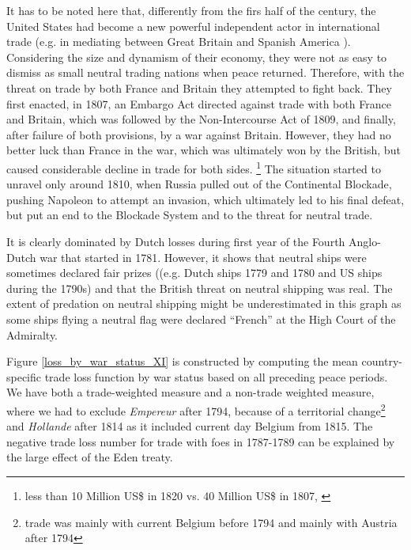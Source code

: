 \documentclass[12pt,a4paper,notitlepage,english]{article}
\begin{document}
It has to be noted here that, differently from the firs half of the century, the United States had become a new powerful independent actor in international trade (e.g. in mediating between Great Britain and Spanish America \citep{Cuenca-Esteban2014}). Considering the size and dynamism of their economy, they were not as easy to dismiss as small neutral trading nations when peace returned. Therefore, with the threat on trade by both France and Britain they attempted to fight back. They first enacted, in 1807, an Embargo Act directed against trade with both France and Britain, which was followed by the Non-Intercourse Act of 1809, and finally, after failure of both provisions, by a war against Britain.
However, they had no better luck than France in the war, which was ultimately won by the British, but caused considerable decline in trade for both sides. \footnote{less than 10 Million US\$ in 1820 vs. 40 Million US\$ in 1807, \citep[tables A-4 and B-2]{North1960}}
The situation started to unravel only around 1810, when Russia pulled out of the Continental Blockade, pushing Napoleon to attempt an invasion, which ultimately led to his final defeat, but put an end to the Blockade System and to the threat for neutral trade.


It is clearly dominated by Dutch losses during first year of the Fourth Anglo-Dutch war that started in 1781. However, it shows that neutral ships were sometimes declared fair prizes ((e.g. Dutch ships 1779 and 1780 and US ships during the 1790s) and that the British threat on neutral shipping was real. The extent of predation on neutral shipping might be underestimated in this graph as some ships flying a neutral flag were declared ``French'' at the High Court of the Admiralty.

Figure \ref{loss_by_war_status_XI} is constructed by computing the mean country-specific trade loss function by war status based on all preceding peace periods.
We have both a trade-weighted measure and a non-trade weighted measure, where we had to exclude \textit{Empereur} after 1794, because of a territorial change\footnote{trade was mainly with current Belgium before 1794 and mainly with Austria after 1794} and \textit{Hollande} after 1814 as it included current day Belgium from 1815.
The negative trade loss number for trade with foes in 1787-1789 can be explained by the large effect of the Eden treaty.
\end{document}
